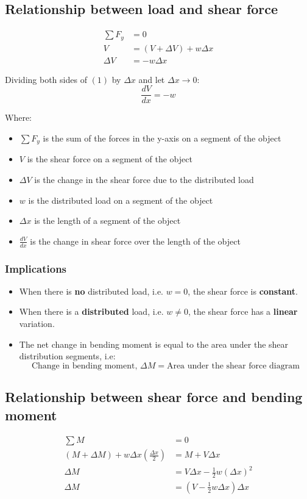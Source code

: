 \documentclass[11pt]{article}
\begin{document}
\subsection{Relationship between load and shear force}
\label{sec:org04d5dd4}
\begin{align*}
\sum F_y &= 0 \\
V &= (V + \Delta V) + w \Delta x \\
\Delta V &= -w \Delta x \tag{1}
\end{align*}

Dividing both sides of \((1)\) by \(\Delta x\) and let \(\Delta x \rightarrow 0\):
\[\frac{dV}{dx} = -w\]

Where:
\begin{itemize}
\item \(\sum F_y\) is the sum of the forces in the y-axis on a segment of the object
\item \(V\) is the shear force on a segment of the object
\item \(\Delta V\) is the change in the shear force due to the distributed load
\item \(w\) is the distributed load on a segment of the object
\item \(\Delta x\) is the length of a segment of the object
\item \(\frac{dV}{dx}\) is the change in shear force over the length of the object
\end{itemize}
\subsubsection{Implications}
\label{sec:orgc04810d}
\begin{itemize}
\item When there is \textbf{no} distributed load, i.e. \(w = 0\), the shear force is \textbf{constant}.
\item When there is a \textbf{distributed} load, i.e. \(w \ne 0\), the shear force has a \textbf{linear} variation.
\item The net change in bending moment is equal to the area under the shear distribution segments, i.e:
\[\text{Change in bending moment, } \Delta M = \text{Area under the shear force diagram}\]
\end{itemize}
\subsection{Relationship between shear force and bending moment}
\label{sec:orge34d958}
\begin{align*}
\sum M &= 0 \\
(M + \Delta M) + w \Delta x \left(\frac{\Delta x}{2} \right) &= M + V \Delta x \\
\Delta M &= V \Delta x - \frac{1}{2}w\left(\Delta x \right)^2 \\
\Delta M &= (V - \frac{1}{2} w \Delta x) \Delta x \tag{2}
\end{align*}
\end{document}

